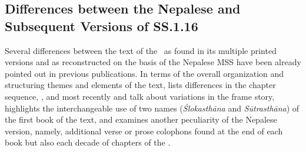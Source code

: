 
\subsection{Differences between the Nepalese and Subsequent Versions of SS.1.16}



Several differences between the text of the \SS\ as found in its multiple printed versions and as reconstructed on the basis of the Nepalese MSS have been already pointed out in previous publications. In terms of the overall organization and structuring themes and elements of the text, \citet[27f.]{kleb-2021b} lists differences in the chapter sequence, \citet{wuja-2013}, \citet[28-32]{kleb-2021b} and most recently \citet{birc-2021} and \citet[2-4]{birc-2021a} talk about variations in the frame story, \citet[32-36]{kleb-2021b} highlights the interchangeable use of two names (\emph{Ślokasthāna} and \emph{Sūtrasthāna}) of the first book of the text, and \citet[37-44]{kleb-2021b} examines another peculiarity of the Nepalese version, namely, additional verse or prose colophons found at the end of each book but also each decade of chapters of the \SS. 


